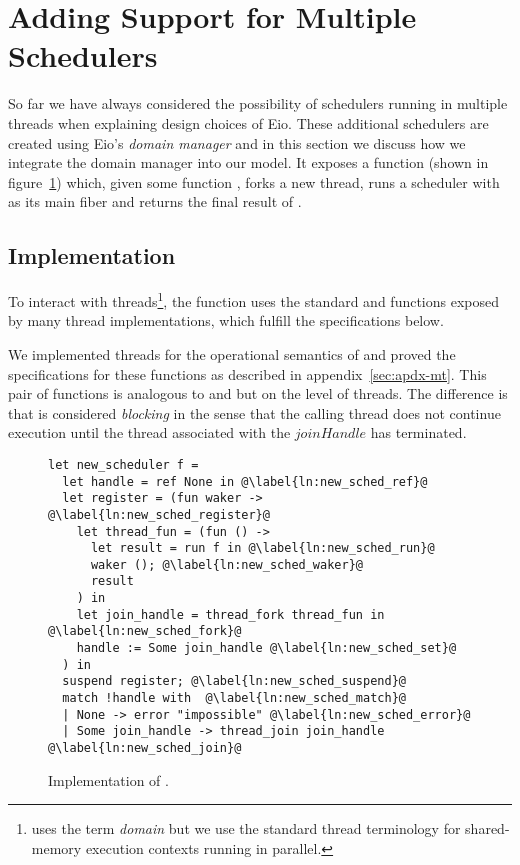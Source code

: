 \section{Adding Support for Multiple Schedulers}
\label{sec:domain-manager}

So far we have always considered the possibility of schedulers running in multiple threads when explaining design choices of Eio.
These additional schedulers are created using Eio's \emph{domain manager} and in this section we discuss how we integrate the domain manager into our model.
It exposes a function  (shown in figure~\ref{fig:dm-impl}) which, given some function , forks a new thread, runs a scheduler with  as its main fiber and returns the final result of .

\subsection{Implementation}
To interact with threads\footnote{\ocf{} uses the term \emph{domain} but we use the standard thread terminology for shared-memory execution contexts running in parallel.},
the function uses the standard  and  functions exposed by many thread implementations, which fulfill the specifications below.
%
We implemented threads for the operational semantics of \hazel{} and proved the specifications for these functions as described in appendix~\ref{sec:apdx-mt}.
This pair of functions is analogous to  and  but on the level of threads.
The difference is that  is considered \emph{blocking} in the sense that the calling thread does not continue execution until the thread associated with the \(joinHandle\) has terminated.

\begin{figure}[ht]
  \begin{verbatim}
let new_scheduler f = 
  let handle = ref None in @\label{ln:new_sched_ref}@
  let register = (fun waker -> @\label{ln:new_sched_register}@ 
    let thread_fun = (fun () ->
      let result = run f in @\label{ln:new_sched_run}@
      waker (); @\label{ln:new_sched_waker}@
      result
    ) in
    let join_handle = thread_fork thread_fun in @\label{ln:new_sched_fork}@
    handle := Some join_handle @\label{ln:new_sched_set}@
  ) in
  suspend register; @\label{ln:new_sched_suspend}@
  match !handle with  @\label{ln:new_sched_match}@
  | None -> error "impossible" @\label{ln:new_sched_error}@
  | Some join_handle -> thread_join join_handle @\label{ln:new_sched_join}@
\end{verbatim}
  \caption{Implementation of .}
  \label{fig:dm-impl}
\end{figure}

